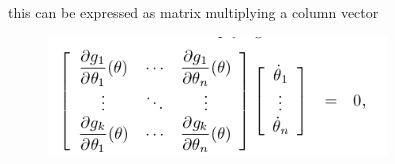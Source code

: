 \documentclass[a4paper]{article}
\begin{document}
        this can be expressed as matrix multiplying a column vector
        \begin{figure}[H]
                                        \centering
                                        \includegraphics[width=0.8\textwidth]{equationofclosedloopasmatrix.png}
                                        \caption{}
                                        \label{fig:}
                                    \end{figure}
\end{document}

